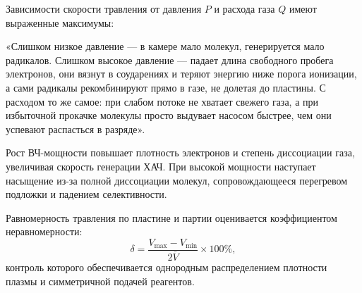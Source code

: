 \documentclass[12pt,a4paper]{article}
\theoremstyle{plain}
\theoremstyle{definition}
\theoremstyle{remark}
\numberwithin{equation}{section}
\begin{document}
Зависимости скорости травления от давления $P$ и расхода газа $Q$ имеют выраженные максимумы:

«Слишком низкое давление — в камере мало молекул, генерируется мало радикалов. Слишком высокое давление — падает длина свободного пробега электронов, они вязнут в соударениях и теряют энергию ниже порога ионизации, а сами радикалы рекомбинируют прямо в газе, не долетая до пластины. С расходом то же самое: при слабом потоке не хватает свежего газа, а при избыточной прокачке молекулы просто выдувает насосом быстрее, чем они успевают распасться в разряде».

Рост ВЧ-мощности повышает плотность электронов и степень диссоциации газа, увеличивая скорость генерации ХАЧ. При высокой мощности наступает насыщение из-за полной диссоциации молекул, сопровождающееся перегревом подложки и падением селективности.

Равномерность травления по пластине и партии оценивается коэффициентом неравномерности:
\begin{equation*}
  \delta = \frac{V_\text{max} - V_\text{min}}{2\overline{V}} \times 100\%,
\end{equation*}
контроль которого обеспечивается однородным распределением плотности плазмы и симметричной подачей реагентов.
\end{document}
